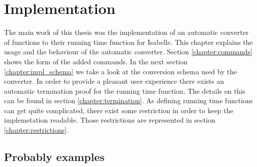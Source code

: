
\chapter{Implementation}\label{chapter:impl}

The main work of this thesis was the implementation of an automatic converter of functions to their running time function for Isabelle.
This chapter explains the usage and the behaviour of the automatic converter.
Section \ref{chapter:commands} shows the form of the added commands.
In the next section \ref{chapter:impl_schema} we take a look at the conversion schema used by the converter.
In order to provide a pleasant user experience there exists an automatic termination proof for the running time function.
The details on this can be found in section \ref{chapter:termination}.
As defining running time functions can get quite complicated, there exist some restriction in order to keep the implemetation readable.
Those restrictions are represented in section \ref{chapter:restrictions}.






\section{Probably examples}
